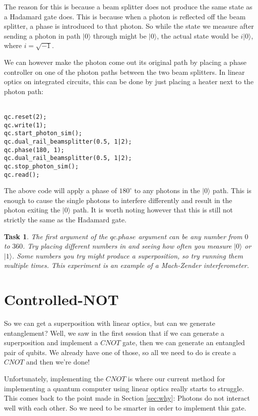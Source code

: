 \documentclass[twocolumn]{article}
\newtheorem{task}{Task}[section]
\begin{document}
The reason for this is because a beam splitter does not produce the same state as a Hadamard gate does. This is because when a photon is reflected off the beam splitter, a phase is introduced to that photon. So while the state we measure after sending a photon in path $|0\rangle$ through might be $|0\rangle$, the actual state would be $i|0\rangle$, where $i = \sqrt{-1}$.

We can however make the photon come out its original path by placing a phase controller on one of the photon paths between the two beam splitters. In linear optics on integrated circuits, this can be done by just placing a heater next to the photon path:
\\\\
\begin{lstlisting}
qc.reset(2);
qc.write(1);
qc.start_photon_sim();
qc.dual_rail_beamsplitter(0.5, 1|2);
qc.phase(180, 1);
qc.dual_rail_beamsplitter(0.5, 1|2);
qc.stop_photon_sim();
qc.read();
\end{lstlisting}

The above code will apply a phase of $180^\circ$ to any photons in the $|0\rangle$ path. This is enough to cause the single photons to interfere differently and result in the photon exiting the $|0\rangle$ path. It is worth noting however that this is still not strictly the same as the Hadamard gate.

\begin{task}
The first argument of the $qc.phase$ argument can be any number from $0$ to $360$. Try placing different numbers in and seeing how often you measure $|0\rangle$ or $|1\rangle$. Some numbers you try might produce a superposition, so try running them multiple times. This experiment is an example of a Mach-Zender interferometer.
\end{task}

\section{Controlled-NOT}

So we can get a superposition with linear optics, but can we generate entanglement? Well, we saw in the first session that if we can generate a superposition and implement a $CNOT$ gate, then we can generate an entangled pair of qubits. We already have one of those, so all we need to do is create a $CNOT$ and then we're done!

Unfortunately, implementing the $CNOT$ is where our current method for implementing a quantum computer using linear optics really starts to struggle. This comes back to the point made in Section \ref{sec:why}: Photons do not interact well with each other. So we need to be smarter in order to implement this gate.
\end{document}
